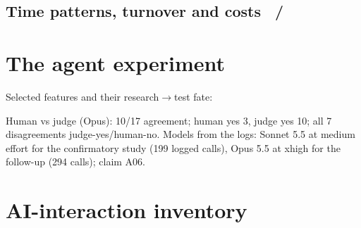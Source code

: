 \subsection*{Time patterns, turnover and costs \hfill \tagc\ / \tagp}
{\footnotesize\setlength{\tabcolsep}{3pt}}\par\medskip
{\footnotesize\setlength{\tabcolsep}{3pt}}\par\medskip
\clearpage\section{The agent experiment}
\noindent{\footnotesize\setlength{\tabcolsep}{4pt}}\par
\medskip
Selected features and their research$\to$test fate:\par\noindent{\footnotesize\setlength{\tabcolsep}{4pt}}\par
\medskip
Human vs judge (Opus): 10/17 agreement; human yes 3, judge yes 10; all 7 disagreements judge-yes/human-no. Models from the logs: Sonnet 5.5 at medium effort for the confirmatory study (199 logged calls), Opus 5.5 at xhigh for the follow-up (294 calls); claim A06.
\clearpage\section{AI-interaction inventory}
